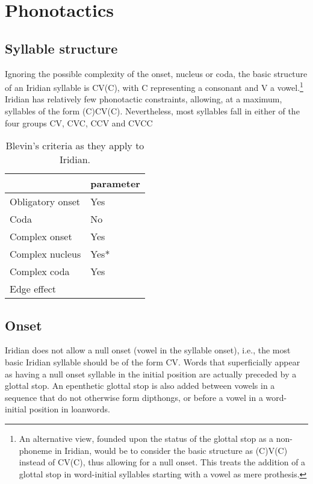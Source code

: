 \section{Phonotactics}\label{sec:phonotactics}

\subsection{Syllable structure}\label{sec:syllable-structure}

Ignoring the possible complexity of the onset, nucleus or coda, the basic structure of an Iridian syllable is CV(C), with C representing a consonant and V a vowel.\footnote{An alternative view, founded upon the status of the glottal stop as a non-phoneme in Iridian, would be to consider the basic structure as (C)V(C) instead of CV(C), thus allowing for a null onset. This treats the addition of a glottal stop in word-initial syllables starting with a vowel as mere prothesis.} Iridian has relatively few phonotactic constraints, allowing, at a maximum, syllables of the form (C)CV(C). Nevertheless, most syllables fall in either of the four groups CV, CVC, CCV and CVCC

\begin{table}[h!]
	\footnotesize\sffamily
	\caption{Blevin's criteria as they apply to Iridian.}
	\begin{tabularx}{0.6\textwidth}{YM}
		\toprule
		& {\sc parameter}\\
		\midrule
		Obligatory onset & Yes\\
		Coda & No\\
		Complex onset & Yes\\
		Complex nucleus & Yes*\\
		Complex coda & Yes\\
		Edge effect & \\
		\bottomrule
	\end{tabularx}
\end{table}


\subsection{Onset}

\par Iridian does not allow a null onset (vowel in the syllable onset), i.e., the most basic Iridian syllable should be of the form CV. Words that superficially appear as having a null onset syllable in the initial position are actually preceded by a glottal stop. An epenthetic glottal stop is also added between vowels in a sequence that do not otherwise form dipthongs, or before a vowel in a word-initial position in loanwords.

